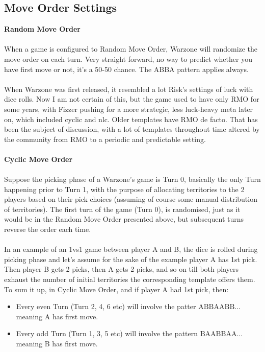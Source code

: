 \subsection{Move Order Settings}

\textbf{Random Move Order} \label{random_move_order}
\\
\\
When a game is configured to Random Move Order, Warzone will randomize the move order on each turn. Very straight forward, no way to predict whether you have first move or not, it's a 50-50 chance. The ABBA pattern applies always. 
\\
\\
When Warzone was first released, it resembled a lot Risk's settings of luck with dice rolls. Now I am not certain of this, but the game used to have only RMO for some years, with Fizzer pushing for a more strategic, less luck-heavy meta later on, which included cyclic and nlc. Older templates have RMO de facto. That has been the subject of discussion, with a lot of templates throughout time altered by the community from RMO to a periodic and predictable setting.
\\
\\
\textbf{Cyclic Move Order} \label{cyclic_move_order}
\\
\\
Suppose the picking phase of a Warzone's game is Turn 0, basically the only Turn happening prior to Turn 1, with the purpose of allocating territories to the 2 players based on their pick choices (assuming of course some manual distribution of territories). The first turn of the game (Turn 0), is randomised, just as it would be in the Random Move Order presented above, but subsequent turns reverse the order each time. 
\\
\\
In an example of an 1vs1 game between player A and B, the dice is rolled during picking phase and let's assume for the sake of the example player A has 1st pick. Then player B gets 2 picks, then A gets 2 picks, and so on till both players exhaust the number of initial territories the corresponding template offers them. To sum it up, in Cyclic Move Order, and if player A had 1st pick, then:
\begin{itemize}
    \item Every even Turn (Turn 2, 4, 6 etc) will involve the patter $\text{ABBAABB} \dots$ meaning A has first move.
    \item Every odd Turn (Turn 1, 3, 5 etc) will involve the pattern $\text{BAABBAA} \dots$ meaning B has first move.
\end{itemize}

